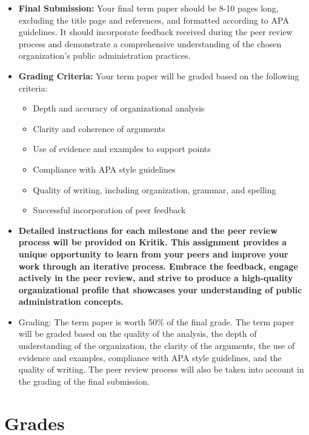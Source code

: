 \documentclass[12pt, letterpaper]{article}
\begin{document}
\begin{itemize}
\begin{itemize}
        \end{itemize}
    \item \textbf{Final Submission:} Your final term paper should be 8-10 pages long, excluding the title page and references, and formatted according to APA guidelines. It should incorporate feedback received during the peer review process and demonstrate a comprehensive understanding of the chosen organization's public administration practices.
    \item \textbf{Grading Criteria:} Your term paper will be graded based on the following criteria:
        \begin{itemize}
            \item Depth and accuracy of organizational analysis
            \item Clarity and coherence of arguments
            \item Use of evidence and examples to support points
            \item Compliance with APA style guidelines
            \item Quality of writing, including organization, grammar, and spelling
            \item Successful incorporation of peer feedback
        \end{itemize}
    \item \textbf{Detailed instructions for each milestone and the peer review process will be provided on Kritik. This assignment provides a unique opportunity to learn from your peers and improve your work through an iterative process. Embrace the feedback, engage actively in the peer review, and strive to produce a high-quality organizational profile that showcases your understanding of public administration concepts.}
    \item Grading: The term paper is worth 50\% of the final grade. The term paper will be graded based on the quality of the analysis, the depth of understanding of the organization, the clarity of the arguments, the use of evidence and examples, compliance with APA style guidelines, and the quality of writing. The peer review process will also be taken into account in the grading of the final submission.

\end{itemize}

\section{Grades}
\end{document}
